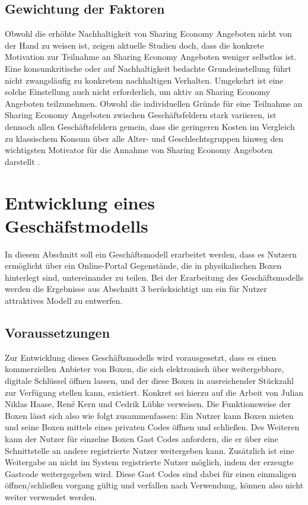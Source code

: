\documentclass[a4paper]{scrartcl}
\begin{document}
\begin{multicols}{2}
		\subsection{Gewichtung der Faktoren}
			Obwohl die erh\"ohte Nachhaltigkeit von Sharing Economy Angeboten nicht von der Hand zu weisen ist, zeigen aktuelle Studien doch, dass die konkrete Motivation zur Teilnahme an Sharing Economy Angeboten weniger selbstlos ist. Eine konsumkritische oder auf Nachhaltigkeit bedachte Grundeinstellung f\"uhrt nicht zwangsl\"aufig zu konkretem nachhaltigen Verhalten\cite{doi:10.1002/asi.23552}. Umgekehrt ist eine solche Einstellung auch nicht erforderlich, um aktiv an Sharing Economy Angeboten teilzunehmen. Obwohl die individuellen Gr\"unde f\"ur eine Teilnahme an Sharing Economy Angeboten zwischen Gesch\"aftsfeldern stark variieren, ist dennoch allen Gesch\"aftsfeldern gemein, dass die geringeren Kosten im Vergleich zu klassischem Konsum \"uber alle Alter- und Geschlechtsgruppen hinweg den wichtigsten Motivator f\"ur die Annahme von Sharing Economy Angeboten darstellt \cite{balck2015,doi:10.1002/asi.23552}.
		
		
	\section{Entwicklung eines Gesch\"afstmodells}
		In diesem Abschnitt soll ein Gesch\"aftsmodell erarbeitet werden, dass es Nutzern erm\"oglicht \"uber ein Online-Portal Gegenst\"ande, die in physikalischen Boxen hinterlegt sind, untereinander zu teilen. Bei der Erarbeitung des Gesch\"aftsmodells werden die Ergebnisse aus Abschnitt 3 ber\"ucksichtigt um ein f\"ur Nutzer attraktives Modell zu entwerfen.
		
	
		\subsection{Voraussetzungen}
			Zur Entwicklung dieses Gesch\"aftsmodells wird vorausgesetzt, dass es einen kommerziellen Anbieter von Boxen, die sich elektronisch \"uber weitergebbare, digitale Schl\"ussel \"offnen lassen, und der diese Boxen in ausreichender St\"uckzahl zur Verf\"ugung stellen kann, existiert. Konkret sei hierzu auf die Arbeit von Julian Niklas Haase, René Kern und Cedrik L\"ubke verweisen. Die Funktionsweise der Boxen l\"asst sich also wie folgt zusammenfassen:
			Ein Nutzer kann Boxen mieten und seine Boxen mittels eines privaten Codes \"offnen und schlie\ss en. Des Weiteren kann der Nutzer f\"ur einzelne Boxen Gast Codes anfordern, die er \"uber eine Schnittstelle an andere registrierte Nutzer weitergeben kann. Zus\"atzlich ist eine Weitergabe an nicht im System registrierte Nutzer m\"oglich, indem der erzeugte Gastcode weitergegeben wird. Diese Gast Codes sind dabei f\"ur einen einmaligen \"offnen/schlie\ss en vorgang g\"ultig und verfallen nach Verwendung, k\"onnen also nicht weiter verwendet werden.
			

\end{multicols}
\end{document}
